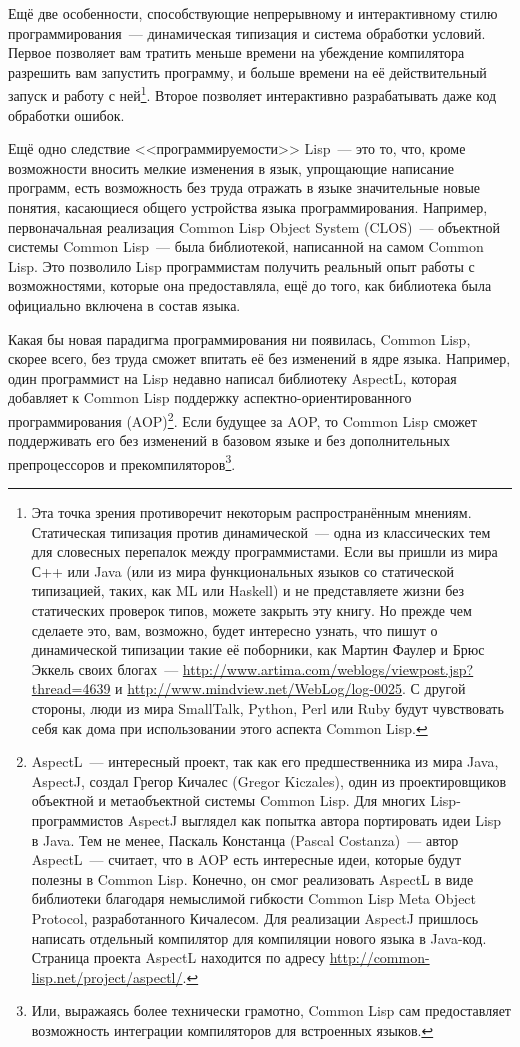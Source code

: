 Ещё две особенности, способствующие непрерывному и интерактивному стилю
программирования~--- динамическая типизация и система обработки условий.
Первое позволяет вам тратить меньше времени на убеждение компилятора разрешить вам
запустить программу, и больше времени на её действительный запуск и работу с
ней\footnote{Эта точка зрения противоречит некоторым распространённым мнениям. Статическая
  типизация против динамической~--- одна из классических тем для словесных перепалок между
  программистами. Если вы пришли из мира С++ или Java (или из мира функциональных языков
  со статической типизацией, таких, как ML или Haskell) и не представляете жизни без
  статических проверок типов, можете закрыть эту книгу. Но прежде чем сделаете это,
  вам, возможно, будет интересно узнать, что пишут о динамической типизации такие её
  поборники, как Мартин Фаулер и Брюс Эккель своих блогах~---
 \url{http://www.artima.com/weblogs/viewpost.jsp?thread=4639} 
  и
  \url{http://www.mindview.net/WebLog/log-0025}.
  С другой стороны, люди из мира
  SmallTalk, Python, Perl или Ruby будут чувствовать себя как дома при использовании этого аспекта Common Lisp.}. Второе позволяет
интерактивно разрабатывать даже код обработки ошибок.

Ещё одно следствие <<программируемости>> Lisp~--- это то, что, кроме
возможности вносить мелкие изменения в язык, упрощающие написание программ,
есть возможность без труда отражать в языке значительные новые понятия, касающиеся общего
устройства языка программирования. Например, первоначальная реализация Common Lisp Object
System (CLOS)~--- объектной системы Common Lisp~--- была библиотекой, написанной на самом
Common Lisp. Это позволило Lisp программистам получить реальный опыт работы с
возможностями, которые она предоставляла, ещё до того, как библиотека была
официально включена в состав языка.

Какая бы новая парадигма программирования ни появилась, Common Lisp, скорее всего, без
труда сможет впитать её без изменений в ядре языка. Например, один программист на Lisp
недавно написал библиотеку AspectL, которая добавляет к Common Lisp поддержку
аспектно-ориентированного программирования (AOP)\footnote{AspectL~--- интересный проект,
  так как его предшественника из мира Java, AspectJ, создал Грегор Кичалес (Gregor
  Kiczales), один из проектировщиков объектной и метаобъектной системы Common Lisp. Для
  многих Lisp-программистов AspectJ выглядел как попытка автора портировать идеи Lisp в
  Java. Тем не менее, Паскаль Констанца (Pascal Costanza)~--- автор AspectL~--- считает, что
  в AOP есть интересные идеи, которые будут полезны в Common Lisp. Конечно, он смог
  реализовать AspectL в виде библиотеки благодаря немыслимой гибкости Common Lisp Meta
  Object Protocol, разработанного Кичалесом. Для реализации AspectJ пришлось написать
  отдельный компилятор для компиляции нового языка в Java-код. Страница проекта AspectL
  находится по адресу \url{http://common-lisp.net/project/aspectl/}.}. Если будущее за
AOP, то Common Lisp сможет поддерживать его без изменений в базовом языке и без
дополнительных препроцессоров и прекомпиляторов\footnote{Или, выражаясь более технически
  грамотно, Common Lisp сам предоставляет возможность интеграции компиляторов
  для встроенных языков.}.

